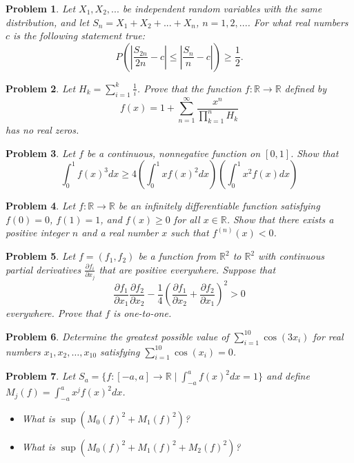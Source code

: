 \documentclass[12pt]{article}
\newtheorem{problem}{Problem}
\begin{document}
\begin{problem}
Let $X_1, X_2, ...$ be independent random variables with the same distribution, and let $S_n = X_1 + X_2 + ... + X_n$, $n = 1, 2, ...$. For what real numbers $c$ is the following statement true:
\[
P\left( \left| \frac{S_{2n}}{2n} - c \right| \leq \left| \frac{S_n}{n} - c \right| \right) \geq \frac{1}{2}.
\]
\end{problem}

\begin{problem}
Let $H_k = \sum_{i=1}^{k} \frac{1}{i}$. Prove that the function $f : \mathbb{R} \to \mathbb{R}$ defined by
\[
f(x) = 1 + \sum_{n=1}^{\infty} \frac{x^n}{\prod_{k=1}^{n} H_k}
\]
has no real zeros.
\end{problem}

\begin{problem}
Let $f$ be a continuous, nonnegative function on $[0, 1]$. Show that
\[
\int_0^1 f(x)^3 dx \geq 4 \left( \int_0^1 x f(x)^2 dx \right) \left( \int_0^1 x^2 f(x) dx \right)
\]
\end{problem}

\begin{problem}
Let $f : \mathbb{R} \to \mathbb{R}$ be an infinitely differentiable function satisfying $f(0) = 0$, $f(1) = 1$, and $f(x) \geq 0$ for all $x \in \mathbb{R}$. Show that there exists a positive integer $n$ and a real number $x$ such that $f^{(n)}(x) < 0$.
\end{problem}

\begin{problem}
Let $f = (f_1, f_2)$ be a function from $\mathbb{R}^2$ to $\mathbb{R}^2$ with continuous partial derivatives $\frac{\partial f_i}{\partial x_j}$ that are positive everywhere. Suppose that
\[
\frac{\partial f_1}{\partial x_1} \frac{\partial f_2}{\partial x_2}
- \frac{1}{4}
\left(\frac{\partial f_1}{\partial x_2} + \frac{\partial f_2}{\partial x_1}\right)^2
> 0
\]
everywhere. Prove that $f$ is one-to-one.
\end{problem}

\begin{problem}
Determine the greatest possible value of $\sum_{i=1}^{10} \cos(3x_i)$ for real numbers $x_1, x_2, \ldots, x_{10}$ satisfying $\sum_{i=1}^{10} \cos(x_i) = 0$.
\end{problem}

\begin{problem}
Let $S_a = \{ f : [-a, a] \to \mathbb{R} \mid \int_{-a}^a f(x)^2 dx = 1 \}$ and define $M_j(f) = \int_{-a}^a x^j f(x)^2 dx$.
\begin{itemize}
    \item What is $\sup (M_0(f)^2 + M_1(f)^2)$?
    \item What is $\sup (M_0(f)^2 + M_1(f)^2 + M_2(f)^2)$?
\end{itemize}
\end{problem}
\end{document}
